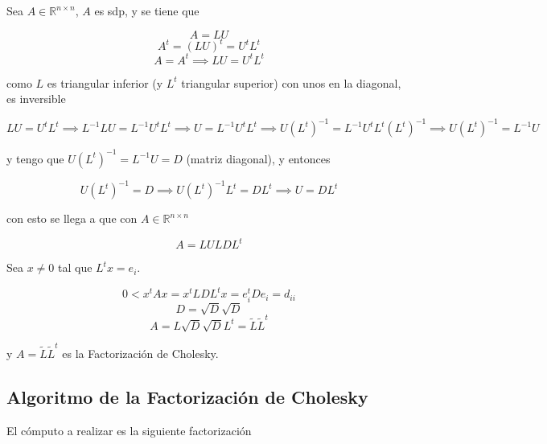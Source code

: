
Sea $A \in \mathbb{R}^{n \times n}$, $A$ es sdp, y se tiene que

\[A = LU\]
\[A^{t} = {(LU)}^{t} = U^{t}L^{t}\]
\[A = A^t \implies LU = U^{t}L^{t}\]

como $L$ es triangular inferior (y $L^t$ triangular superior) con unos en la diagonal, es inversible

\[LU = U^t L^t \implies L^{-1}LU = L^{-1}U^{t}L^{t} \implies U = L^{-1}U^{t}L^{t} \implies 
U{(L^t)}^{-1} = L^{-1}U^{t}L^{t}{(L^t)}^{-1} \implies U{(L^t)}^{-1} = L^{-1}U\]

y tengo que $U{(L^t)}^{-1} = L^{-1}U = D$ (matriz diagonal), y entonces

\[U{(L^t)}^{-1} = D \implies U{(L^t)}^{-1}L^t = DL^t \implies U = DL^t\]

con esto se llega a que con $A \in \mathbb{R}^{n \times n}$

\[A = LU LDL^t\]

Sea $x \neq 0$ tal que $L^t x = e_i$.

\[0 < x^t Ax = x^t LDL^t x = e_{i}^{t}De_i = d_{ii}\]
\[D = \sqrt{D}\sqrt{D}\]
\[A = L\sqrt{D}\sqrt{D}L^t = \widetilde{L}\widetilde{L}^{t}\]

y $A = \widetilde{L}\widetilde{L}^{t}$ es la Factorización de Cholesky.

\subsection{Algoritmo de la Factorización de Cholesky}\label{subsec:algoritmo_de_cholesky}

El cómputo a realizar es la siguiente factorización

